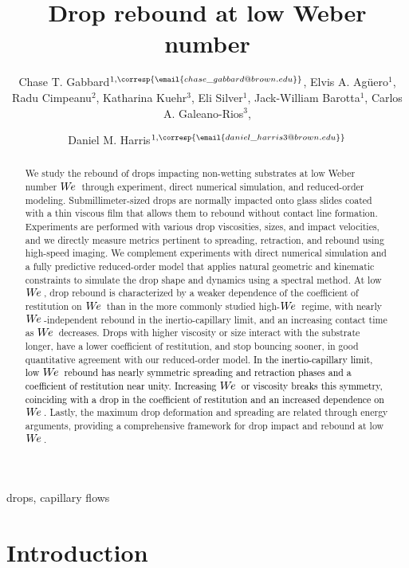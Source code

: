 \documentclass{jfm}
\title{Drop rebound at low Weber number}
\author{Chase T. Gabbard$^{1, \corresp{\email{chase\_gabbard@brown.edu}}}$, Elvis A. Ag\"uero$^{1}$, Radu Cimpeanu$^{2}$, Katharina Kuehr$^{3}$, Eli Silver$^{1}$, Jack-William Barotta$^{1}$, Carlos A. Galeano-Rios$^{3}$, \and Daniel M. Harris$^{1, \corresp{\email{daniel\_harris3@brown.edu}}}$}
\affiliation{$^{1}$School of Engineering, Brown University, Providence, RI 02912, USA  \\ $^{2}$Mathematics Institute, University of Warwick, Coventry CV4 7AL, UK \\ $^{3}$College of Computational Sciences, Minerva University, San Francisco, CA 94103, USA}
\newcommand{\edit}[1]{\textcolor{black}{#1}}
\newcommand{\We}{W\kern-0.15em e\,}
\begin{document}
\maketitle

\begin{abstract}
We study the rebound of drops impacting non-wetting substrates at low Weber number $\We$ through experiment, direct numerical simulation, and reduced-order modeling. Submillimeter-sized drops are normally impacted onto glass slides coated with a thin viscous film that allows them to rebound without contact line formation. Experiments are performed with various drop viscosities, sizes, and impact velocities, and we directly measure metrics pertinent to spreading, retraction, and rebound using high-speed imaging. We complement experiments with direct numerical simulation and a fully predictive reduced-order model that applies natural geometric and kinematic constraints to simulate the drop shape and dynamics using a spectral method. At low $\We$, drop rebound is characterized by a weaker dependence of the coefficient of restitution on $\We$ than in the more commonly studied high-$\We$ regime, with nearly $\We$-independent rebound in the inertio-capillary limit, and an increasing contact time as $\We$ decreases. Drops with higher viscosity or size interact with the substrate longer, have a lower coefficient of restitution, and stop bouncing sooner, in good quantitative agreement with our reduced-order model. \edit{In the inertio-capillary limit, low $\We$ rebound has nearly symmetric spreading and retraction phases and a coefficient of restitution near unity. Increasing $\We$ or viscosity breaks this symmetry, coinciding with a drop in the coefficient of restitution and an increased dependence on $\We$.} Lastly, the maximum drop deformation and spreading are related through energy arguments, providing a comprehensive framework for drop impact and rebound at low $\We$. 
\end{abstract}

\begin{keywords}
drops, capillary flows
\end{keywords}

\section{Introduction}\label{sec:introduction}
\end{document}
